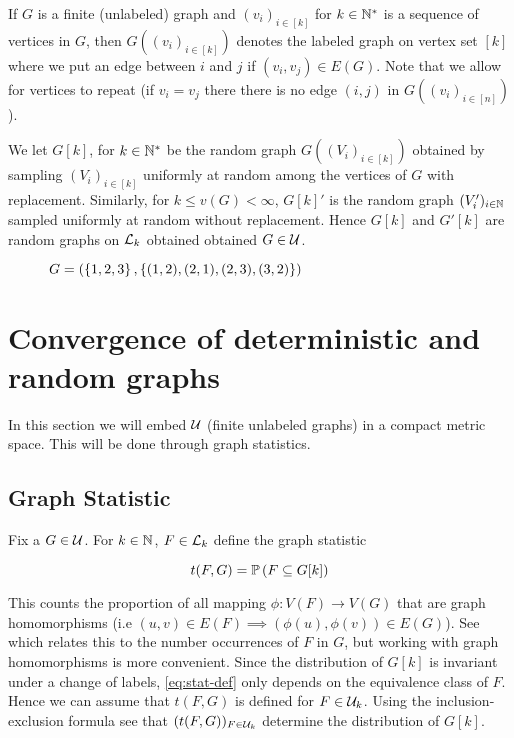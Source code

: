 \documentclass{article}
\begin{document}
If $G$ is a finite (unlabeled) graph and $(v_i)_{i \in [k]}$ for $k \in \N*$ is a sequence of vertices in $G$, then $G((v_i)_{i \in [k]})$ denotes the labeled graph on vertex set $[k]$ where we put an edge between $i$ and $j$ if $(v_i, v_j) \in E(G)$. Note that we allow for vertices to repeat (if $v_i = v_j$ there there is no edge $(i, j)$ in $G((v_i)_{i \in [n]})$).

We let $G[k]$, for $k \in \N*$ be the random graph $G((V_i)_{i \in [k]})$ obtained by sampling $(V_i)_{i \in [k]}$ uniformly at random among the vertices of $G$ with replacement. Similarly, for $k \leq v(G) < \infty$, $G[k]'$ is the random graph $(V'_i)_{i \in \N}$ sampled uniformly at random without replacement. Hence $G[k]$ and $G'[k]$ are random graphs on $\Lg_{k}$ obtained obtained $G \in \Ug$. 


\begin{figure}
  \centering
  \caption{$G=(\left\{ 1, 2, 3 \right\}, \left\{ (1,2), (2,1), (2,3), (3,2) \right\})$}
  \label{fig:example-graph}
\end{figure}


\section{Convergence of deterministic and random graphs}

In this section we will embed $\Ug$ (finite unlabeled graphs) in a compact metric space. This will be done through graph statistics.

\subsection{Graph Statistic}

Fix a $G \in \Ug$. For $k \in \N$, $F \in \Lg_{k}$  define the graph statistic

\begin{equation}
  t(F, G) = \Pb(F \subseteq G[k])
  \label{eq:stat-def}
\end{equation}

This counts the proportion of all mapping $\phi : V(F) \to V(G)$ that are graph homomorphisms (i.e $(u, v) \in E(F) \implies (\phi(u), \phi(v)) \in E(G)$). See \cite[p.~6]{paper} which relates this to the number occurrences of $F$ in $G$, but working with graph homomorphisms is more convenient. Since the distribution of $G[k]$ is invariant under a change of labels, \eqref{eq:stat-def} only depends on the equivalence class of $F$. Hence we can assume that $t(F,G)$ is defined for $F \in \Ug_{k}$.  Using the inclusion-exclusion formula see that $(t(F, G))_{F \in \Ug_{k}}$ determine the distribution of $G[k]$. 
\end{document}
